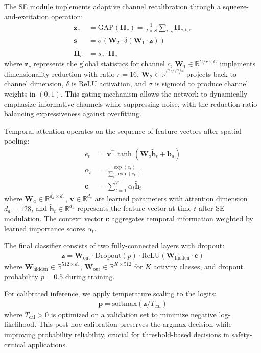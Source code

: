 \documentclass[lettersize,journal]{IEEEtran}
\begin{document}
The SE module implements adaptive channel recalibration through a squeeze-and-excitation operation:
\begin{align}
\mathbf{z}_c &= \mathrm{GAP}(\mathbf{H}_c) = \frac{1}{T \times S} \sum_{t,s} \mathbf{H}_{c,t,s} \\
\mathbf{s} &= \sigma(\mathbf{W}_2 \cdot \delta(\mathbf{W}_1 \cdot \mathbf{z})) \\
\tilde{\mathbf{H}}_c &= s_c \cdot \mathbf{H}_c
\end{align}
where $\mathbf{z}_c$ represents the global statistics for channel $c$, $\mathbf{W}_1 \in \mathbb{R}^{C/r \times C}$ implements dimensionality reduction with ratio $r{=}16$, $\mathbf{W}_2 \in \mathbb{R}^{C \times C/r}$ projects back to channel dimension, $\delta$ is ReLU activation, and $\sigma$ is sigmoid to produce channel weights in $(0,1)$. This gating mechanism allows the network to dynamically emphasize informative channels while suppressing noise, with the reduction ratio balancing expressiveness against overfitting.

Temporal attention operates on the sequence of feature vectors after spatial pooling:
\begin{align}
e_t &= \mathbf{v}^\top \tanh(\mathbf{W}_a \tilde{\mathbf{h}}_t + \mathbf{b}_a) \\
\alpha_t &= \frac{\exp(e_t)}{\sum_{t'} \exp(e_{t'})} \\
\mathbf{c} &= \sum_{t=1}^{T} \alpha_t \tilde{\mathbf{h}}_t
\end{align}
where $\mathbf{W}_a \in \mathbb{R}^{d_a \times d_h}$, $\mathbf{v} \in \mathbb{R}^{d_a}$ are learned parameters with attention dimension $d_a{=}128$, and $\tilde{\mathbf{h}}_t \in \mathbb{R}^{d_h}$ represents the feature vector at time $t$ after SE modulation. The context vector $\mathbf{c}$ aggregates temporal information weighted by learned importance scores $\alpha_t$.

The final classifier consists of two fully-connected layers with dropout:
\begin{align}
\mathbf{z} = \mathbf{W}_{\text{out}} \cdot \mathrm{Dropout}(p) \cdot \mathrm{ReLU}(\mathbf{W}_{\text{hidden}} \cdot \mathbf{c})
\end{align}
where $\mathbf{W}_{\text{hidden}} \in \mathbb{R}^{512 \times d_h}$, $\mathbf{W}_{\text{out}} \in \mathbb{R}^{K \times 512}$ for $K$ activity classes, and dropout probability $p{=}0.5$ during training.

For calibrated inference, we apply temperature scaling to the logits:
\begin{align}
\mathbf{p} = \mathrm{softmax}(\mathbf{z}/T_{\text{cal}})
\end{align}
where $T_{\text{cal}} > 0$ is optimized on a validation set to minimize negative log-likelihood. This post-hoc calibration preserves the argmax decision while improving probability reliability, crucial for threshold-based decisions in safety-critical applications.
\end{document}
